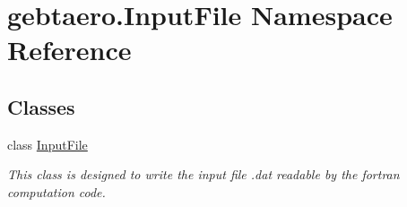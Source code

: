 \hypertarget{namespacegebtaero_1_1_input_file}{}\section{gebtaero.\+Input\+File Namespace Reference}
\label{namespacegebtaero_1_1_input_file}
\subsection*{Classes}
\begin{DoxyCompactItemize}
\item 
class \hyperlink{classgebtaero_1_1_input_file_1_1_input_file}{Input\+File}
\begin{DoxyCompactList}\small\item\em This class is designed to write the input file .dat readable by the fortran computation code. \end{DoxyCompactList}\end{DoxyCompactItemize}
